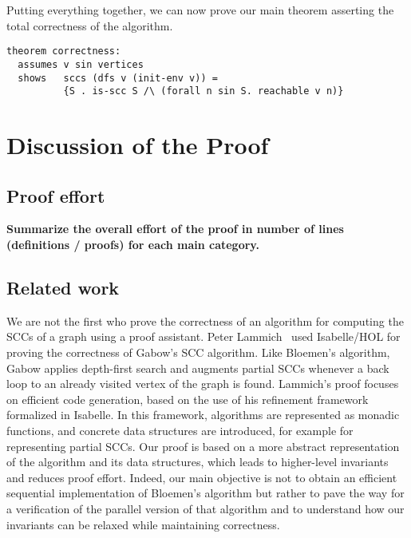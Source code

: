 \documentclass[sigplan,10pt,anonymous,review]{acmart}
\begin{document}
Putting everything together, we can now prove our main theorem asserting the total correctness of the algorithm.

\begin{small}
\begin{lstlisting}[language=isabelle]
theorem correctness:
  assumes v sin vertices
  shows   sccs (dfs v (init-env v)) = 
          {S . is-scc S /\ (forall n sin S. reachable v n)}
\end{lstlisting}
\end{small}


\section{Discussion of the Proof}
\label{sec:discussion}

\subsection{Proof effort}
\label{sec:effort}

\textbf{Summarize the overall effort of the proof in number of lines (definitions / proofs) for each main category.}


\subsection{Related work}
\label{sec:related}

We are not the first who prove the correctness of an algorithm for computing the SCCs of a graph using a proof assistant. Peter Lammich~\cite{lammich:gabow} used Isabelle/HOL for proving the correctness of Gabow's SCC algorithm. Like Bloemen's algorithm, Gabow applies depth-first search and augments partial SCCs whenever a back loop to an already visited vertex of the graph is found. Lammich's proof focuses on efficient code generation, based on the use of his refinement framework~\cite{lammich:refinement} formalized in Isabelle. In this framework, algorithms are represented as monadic functions, and concrete data structures are introduced, for example for representing partial SCCs. Our proof is based on a more abstract representation of the algorithm and its data structures, which leads to higher-level invariants and reduces proof effort. Indeed, our main objective is not to obtain an efficient sequential implementation of Bloemen's algorithm but rather to pave the way for a verification of the parallel version of that algorithm and to understand how our invariants can be relaxed while maintaining correctness.
\end{document}
